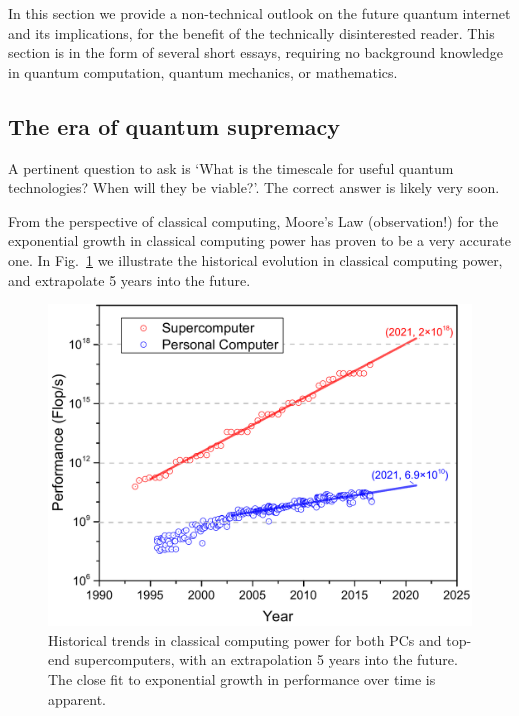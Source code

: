 \documentclass[aps, rmp, twocolumn, amsmath, amssymb, nofootinbib, superscriptaddress, longbibliography, floatfix, table-of-contents, eqsecnum]{revtex4-1}
\begin{document}
In this section we provide a non-technical outlook on the future quantum internet and its implications, for the benefit of the technically disinterested reader. This section is in the form of several short essays, requiring no background knowledge in quantum computation, quantum mechanics, or mathematics.

%
%

\subsection{The era of quantum supremacy} \label{sec:era_quant} 

A pertinent question to ask is `What is the timescale for useful quantum technologies? When will they be viable?'. The correct answer is likely very soon.

From the perspective of classical computing, Moore's Law (observation!) for the exponential growth in classical computing power has proven to be a very accurate one. In Fig.~\ref{fig:moores_law} we illustrate the historical evolution in classical computing power, and extrapolate 5 years into the future.

\begin{figure}[!htb]
\includegraphics[width=\columnwidth]{moores_law}
\caption{Historical trends in classical computing power for both PCs and top-end supercomputers, with an extrapolation 5 years into the future. The close fit to exponential growth in performance over time is apparent.} \label{fig:moores_law}
\end{figure}
\end{document}
